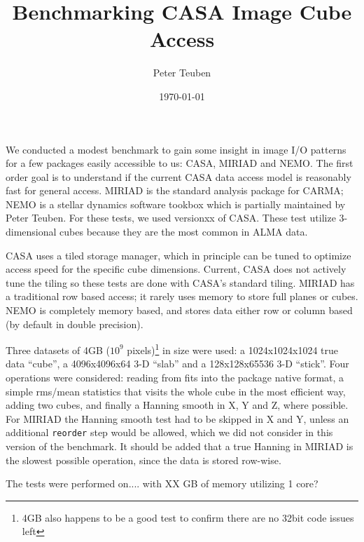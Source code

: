 \documentclass{article}
\title{Benchmarking CASA Image Cube Access}
\author{Peter Teuben}
\date{\today}
\begin{document}
\maketitle


We conducted a modest benchmark to gain some insight in image
I/O patterns for a few packages easily accessible to us: CASA,
MIRIAD and NEMO. The first order goal is to understand if the
current CASA data access model is reasonably fast for general
access.
MIRIAD is the standard analysis package for
CARMA; NEMO is a stellar dynamics software tookbox which is
partially maintained by Peter Teuben. For these tests, we
used versionxx of CASA. These test utilize 3-dimensional cubes
because they are the most common in ALMA data.

CASA uses a tiled storage manager, which in principle
can be tuned to optimize access speed for the specific
cube dimensions.  Current, CASA does not actively tune
the tiling so these tests are done with CASA's standard tiling.
MIRIAD has a traditional row based access; it rarely
uses memory to store full planes or cubes. NEMO is completely
memory based, and stores data either row or column based
(by default in double precision).

Three datasets of 4GB ($10^9$ pixels)\footnote{4GB also happens to
be a good test to confirm there are no 32bit code issues left}
in size were used:
a 1024x1024x1024 true data ``cube'',
a 4096x4096x64 3-D ``slab'' and a 128x128x65536 3-D ``stick''.
Four operations were considered:  reading from fits
into the package native format,
a simple rms/mean statistics that visits the whole cube in the
most efficient way, adding two cubes, and finally
a Hanning smooth in X, Y and Z, where possible.  For MIRIAD
the Hanning smooth test had to be skipped in X and Y, unless
an additional {\tt reorder} step would be allowed, which we did
not consider in this version of the benchmark.
It should be added that a true Hanning in MIRIAD
is the slowest possible operation, since the data is stored
row-wise.

The tests were performed on.... with XX GB of memory utilizing 1 core?
\end{document}
